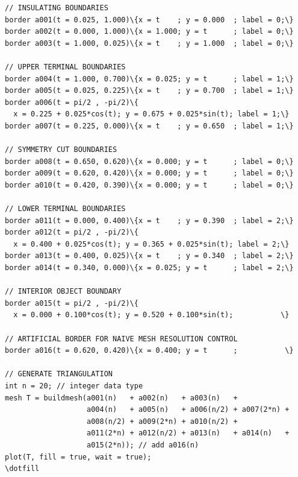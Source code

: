 \documentclass[9pt]{amsart}
\theoremstyle{remark}
\theoremstyle{definition}
\begin{document}
\begin{Verbatim}[commandchars=\\\{\}]
// INSULATING BOUNDARIES
border a001(t = 0.025, 1.000)\{x = t    ; y = 0.000  ; label = 0;\}
border a002(t = 0.000, 1.000)\{x = 1.000; y = t      ; label = 0;\}
border a003(t = 1.000, 0.025)\{x = t    ; y = 1.000  ; label = 0;\}

// UPPER TERMINAL BOUNDARIES
border a004(t = 1.000, 0.700)\{x = 0.025; y = t      ; label = 1;\}
border a005(t = 0.025, 0.225)\{x = t    ; y = 0.700  ; label = 1;\}
border a006(t = pi/2 , -pi/2)\{
  x = 0.225 + 0.025*cos(t); y = 0.675 + 0.025*sin(t); label = 1;\}
border a007(t = 0.225, 0.000)\{x = t    ; y = 0.650  ; label = 1;\}

// SYMMETRY CUT BOUNDARIES
border a008(t = 0.650, 0.620)\{x = 0.000; y = t      ; label = 0;\}
border a009(t = 0.620, 0.420)\{x = 0.000; y = t      ; label = 0;\}
border a010(t = 0.420, 0.390)\{x = 0.000; y = t      ; label = 0;\}

// LOWER TERMINAL BOUNDARIES
border a011(t = 0.000, 0.400)\{x = t    ; y = 0.390  ; label = 2;\}
border a012(t = pi/2 , -pi/2)\{
  x = 0.400 + 0.025*cos(t); y = 0.365 + 0.025*sin(t); label = 2;\}
border a013(t = 0.400, 0.025)\{x = t    ; y = 0.340  ; label = 2;\}
border a014(t = 0.340, 0.000)\{x = 0.025; y = t      ; label = 2;\}

// INTERIOR OBJECT BOUNDARY
border a015(t = pi/2 , -pi/2)\{
  x = 0.000 + 0.100*cos(t); y = 0.520 + 0.100*sin(t);           \}

// ARTIFICIAL BORDER FOR NAIVE MESH RESOLUTION CONTROL
border a016(t = 0.620, 0.420)\{x = 0.400; y = t      ;           \}

// GENERATE TRIANGULATION
int n = 20; // integer data type
mesh T = buildmesh(a001(n)   + a002(n)   + a003(n)   +
                   a004(n)   + a005(n)   + a006(n/2) + a007(2*n) +
                   a008(n/2) + a009(2*n) + a010(n/2) +
                   a011(2*n) + a012(n/2) + a013(n)   + a014(n)   +
                   a015(2*n)); // add a016(n)
plot(T, fill = true, wait = true);
\dotfill


\end{Verbatim}
\end{document}
